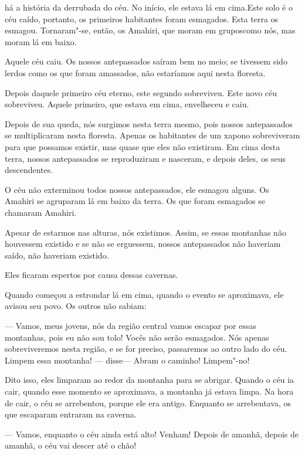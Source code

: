  

 há a história da derrubada do céu. No início, ele
estava lá em cima.Este solo é o céu caído, portanto, os primeiros
habitantes foram esmagados. Esta terra os esmagou. Tornaram"-se, então,
os Amahiri, que moram em gruposcomo nós, mas moram lá em baixo. 

Aquele céu caiu. Os nossos antepassados saíram bem no meio; se tivessem
sido lerdos como os que foram amassados, não estaríamos aqui nesta
floresta. 

Depois daquele primeiro céu eterno, este segundo sobreviveu. Este novo
céu sobreviveu. Aquele primeiro, que estava em cima, envelheceu e caiu. 

Depois de sua queda, nós surgimos nesta terra mesmo, pois nossos
antepassados se multiplicaram nesta floresta. Apenas os habitantes de um
xapono sobreviveram para que possamos existir, mas quase que eles não
existiram. Em cima desta terra, nossos antepassados se reproduziram e
nasceram, e depois deles, os seus descendentes. 

O céu não exterminou todos nossos antepassados, ele esmagou alguns. Os
Amahiri se agruparam lá em baixo da terra. Os que foram esmagados se
chamaram Amahiri. 

Apesar de estarmos nas alturas, nós existimos. Assim, se essas montanhas
não houvessem existido e se não se erguessem, nossos antepassados não
haveriam saído, não haveriam existido. 

Eles ficaram espertos por causa dessas cavernas.

Quando começou a estrondar lá em cima, quando o evento se
aproximava, ele avisou seu povo. Os outros não sabiam:

--- Vamos, meus jovens, nós da região central vamos escapar por essas
montanhas, pois eu não sou tolo! Vocês não serão esmagados. Nós apenas
sobreviveremos nesta região, e se for preciso, passaremos ao outro lado
do céu. Limpem essa montanha! --- disse--- Abram o caminho! Limpem"-no! 

Dito isso, eles limparam ao redor da montanha para se abrigar. Quando o
céu ia cair, quando esse momento se aproximava, a montanha já estava
limpa. Na hora de cair, o céu se arrebentou, porque ele era antigo.
Enquanto se arrebentava, os que escaparam entraram na caverna. 

--- Vamos, enquanto o céu ainda está alto! Venham! Depois de amanhã,
depois de amanhã, o céu vai descer até o chão! 

